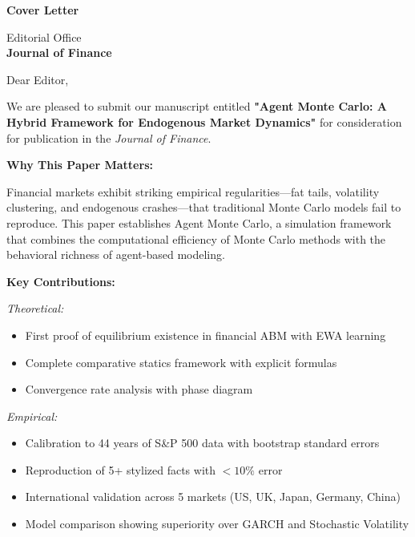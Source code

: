 \documentclass[11pt]{article}
\begin{document}
\begin{center}
\textbf{\Large Cover Letter}
\end{center}

\vspace{1cm}

\noindent
Editorial Office \\
\textbf{Journal of Finance} \\

\vspace{0.5cm}

\noindent
Dear Editor,

\vspace{0.3cm}

\noindent
We are pleased to submit our manuscript entitled \textbf{"Agent Monte Carlo: A Hybrid Framework for Endogenous Market Dynamics"} for consideration for publication in the \textit{Journal of Finance}.

\vspace{0.3cm}

\noindent
\textbf{Why This Paper Matters:}

\vspace{0.2cm}

\noindent
Financial markets exhibit striking empirical regularities---fat tails, volatility clustering, and endogenous crashes---that traditional Monte Carlo models fail to reproduce. This paper establishes Agent Monte Carlo, a simulation framework that combines the computational efficiency of Monte Carlo methods with the behavioral richness of agent-based modeling.

\vspace{0.3cm}

\noindent
\textbf{Key Contributions:}

\vspace{0.2cm}

\noindent
\textit{Theoretical:}
\begin{itemize}
    \item First proof of equilibrium existence in financial ABM with EWA learning
    \item Complete comparative statics framework with explicit formulas
    \item Convergence rate analysis with phase diagram
\end{itemize}

\vspace{0.2cm}

\noindent
\textit{Empirical:}
\begin{itemize}
    \item Calibration to 44 years of S\&P 500 data with bootstrap standard errors
    \item Reproduction of 5+ stylized facts with $<10\%$ error
    \item International validation across 5 markets (US, UK, Japan, Germany, China)
    \item Model comparison showing superiority over GARCH and Stochastic Volatility
\end{itemize}
\end{document}
